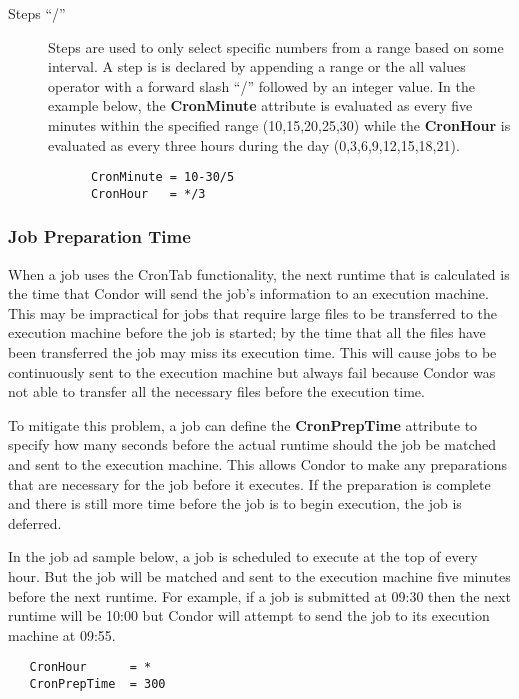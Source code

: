 \documentclass[a4paper, 11pt]{article}
\newcommand{\SubmitCmd}[1]{\textbf{#1}}		%
\begin{document}
\begin{description}
   \item[Steps ``/'']
   Steps are used to only select specific numbers from a range based on 
   some interval. A step is is declared by appending a range or the all
   values operator with a forward slash ``/'' followed by an integer
   value. In the example below, the \SubmitCmd{CronMinute}
   attribute is evaluated as every five minutes within the specified
   range (10,15,20,25,30) while the \SubmitCmd{CronHour} is evaluated as 
   every three hours during the day (0,3,6,9,12,15,18,21).
   
   \begin{verbatim}
      CronMinute = 10-30/5
      CronHour   = */3
   \end{verbatim}

\end{description}

\subsubsection{Job Preparation Time}
\label{sec:jobdeferral-preptime}
When a job uses the CronTab functionality, the next runtime that is calculated is
the time that Condor will send the job's information to an execution machine.
This may be impractical for jobs that require large files to be transferred to
the execution machine before the job is started; by the time that all the 
files have been transferred the job may miss its execution time. This will cause
jobs to be continuously sent to the execution machine but always fail because Condor was not able to transfer all the necessary files before the execution time.

To mitigate this problem, a job can define the \SubmitCmd{CronPrepTime}
attribute to specify how many seconds before the actual runtime should the
job be matched and sent to the execution machine. This allows Condor to
make any preparations that are necessary for the job before it executes. If
the preparation is complete and there is still more time before the job
is to begin execution, the job is deferred.

In the job ad sample below, a job is scheduled to execute at the top of every hour.
But the job will be matched and sent to the execution machine five minutes
before the next runtime. For example, if a job is submitted at 09:30 then the 
next runtime will be 10:00 but Condor will attempt to send the job to
its execution machine at 09:55.

\begin{verbatim}
   CronHour      = *
   CronPrepTime  = 300
\end{verbatim}
\end{document}
